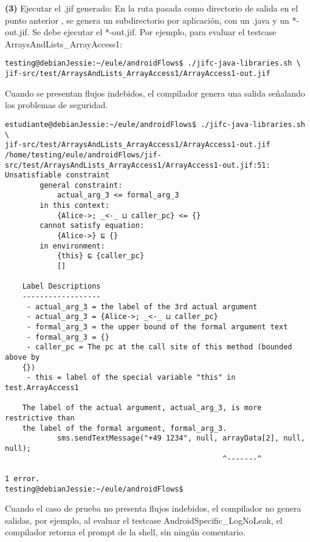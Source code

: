 \textbf{(3)} 
Ejecutar el .jif generado:\newline
En la ruta pasada como directorio de salida en el punto anterior
{\small{}}, se genera un subdirectorio por
aplicación, con un .java y un *-out.jif. Se debe ejecutar el *-out.jif. Por
ejemplo, para evaluar el testcase ArraysAndLists\_ArrayAccess1:
\begin{lstlisting}
testing@debianJessie:~/eule/androidFlows$ ./jifc-java-libraries.sh \
jif-src/test/ArraysAndLists_ArrayAccess1/ArrayAccess1-out.jif
\end{lstlisting}
Cuando se presentan flujos indebidos, el compilador genera una salida señalando
los problemas de seguridad.
\lstset{
    language=bash,
    basicstyle=\tiny,
  }
\begin{lstlisting}
estudiante@debianJessie:~/eule/androidFlows$ ./jifc-java-libraries.sh \
jif-src/test/ArraysAndLists_ArrayAccess1/ArrayAccess1-out.jif 
/home/testing/eule/androidFlows/jif-src/test/ArraysAndLists_ArrayAccess1/ArrayAccess1-out.jif:51:
Unsatisfiable constraint
    	general constraint:
    		actual_arg_3 <= formal_arg_3
    	in this context:
    		{Alice->; _<-_ ⊔ caller_pc} <= {}
    	cannot satisfy equation:
    		{Alice->} ⊑ {}
    	in environment:
    		{this} ⊑ {caller_pc}
    		[]

    Label Descriptions
    ------------------
     - actual_arg_3 = the label of the 3rd actual argument
     - actual_arg_3 = {Alice->; _<-_ ⊔ caller_pc}
     - formal_arg_3 = the upper bound of the formal argument text
     - formal_arg_3 = {}
     - caller_pc = The pc at the call site of this method (bounded above by 
    {})
     - this = label of the special variable "this" in test.ArrayAccess1

    The label of the actual argument, actual_arg_3, is more restrictive than 
    the label of the formal argument, formal_arg_3.
            sms.sendTextMessage("+49 1234", null, arrayData[2], null, null);
                                                  ^-------^

1 error.
testing@debianJessie:~/eule/androidFlows$
\end{lstlisting}

Cuando el caso de prueba no presenta flujos indebidos, el compilador no genera
salidas, por ejemplo, al evaluar el testcase AndroidSpecific\_LogNoLeak, el
compilador retorna el prompt de la shell, sin ningún comentario.

